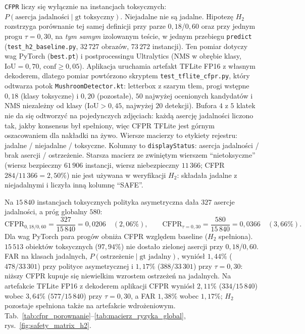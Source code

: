 \texttt{CFPR} liczy się wyłącznie na instancjach toksycznych: $P(\text{asercja jadalności}\mid\text{gt toksyczny})$. Niejadalne nie są jadalne. Hipotezę $H_2$ rozstrzyga porównanie tej samej definicji przy parze $0{,}18$/$0{,}60$ oraz przy jednym progu $\tau=0{,}30$, na \emph{tym samym} izolowanym teście, w jednym przebiegu \texttt{predict} (\texttt{test\_h2\_baseline.py}, $32\,727$ obrazów, $73\,272$ instancji). Ten pomiar dotyczy wag PyTorch (\texttt{best.pt}) i postprocessingu Ultralytics (NMS w obrębie klasy, $\mathrm{IoU}=0{,}70$, $\mathrm{conf}\ge0{,}05$). Aplikacja uruchamia artefakt TFLite FP16 z własnym dekoderem, dlatego pomiar powtórzono skryptem \texttt{test\_tflite\_cfpr.py}, który odtwarza potok \texttt{MushroomDetector.kt}: letterbox z szarym tłem, progi wstępne $0{,}18$ (klasy toksyczne) i $0{,}20$ (pozostałe), $50$ najwyżej ocenionych kandydatów i NMS niezależny od klasy ($\mathrm{IoU}>0{,}45$, najwyżej $20$ detekcji). Bufora $4$ z $5$ klatek nie da się odtworzyć na pojedynczych zdjęciach: każdą asercję jadalności liczono tak, jakby konsensus był spełniony, więc CFPR TFLite jest górnym oszacowaniem dla nakładki na żywo. Wiersze macierzy to etykiety rejestru: jadalne / niejadalne / toksyczne. Kolumny to \texttt{displayStatus}: asercja jadalności / brak asercji / ostrzeżenie. Starsza macierz ze zwiniętym wierszem ``nietoksyczne'' (wiersz bezpieczny $61\,906$ instancji, wiersz niebezpieczny $11\,366$; CFPR $284/11\,366=2{,}50\%$) nie jest używana w weryfikacji $H_2$: składała jadalne z niejadalnymi i liczyła inną kolumnę ``SAFE''.

Na $15\,840$ instancjach toksycznych polityka asymetryczna dała $327$ asercje jadalności, a próg globalny $580$:
\begin{equation}
\mathrm{CFPR}_{0{,}18/0{,}60}
=
\frac{327}{15\,840}
=
0{,}0206
\quad (2{,}06\%),\qquad
\mathrm{CFPR}_{\tau=0{,}30}
=
\frac{580}{15\,840}
=
0{,}0366
\quad (3{,}66\%).
\end{equation}
Dla wag PyTorch para progów obniża CFPR względem baseline ($H_2$ spełniona). $15\,513$ obiektów toksycznych ($97{,}94\%$) nie dostało zielonej asercji przy $0{,}18$/$0{,}60$. FAR na klasach jadalnych, $P(\text{ostrzeżenie}\mid\text{gt jadalny})$, wyniósł $1{,}44\%$ ($478/33\,301$) przy polityce asymetrycznej i $1{,}17\%$ ($388/33\,301$) przy $\tau=0{,}30$: niższy CFPR kupuje się niewielkim wzrostem ostrzeżeń na jadalnych. Na artefakcie TFLite FP16 z dekoderem aplikacji CFPR wyniósł $2{,}11\%$ ($334/15\,840$) wobec $3{,}64\%$ ($577/15\,840$) przy $\tau=0{,}30$, a FAR $1{,}38\%$ wobec $1{,}17\%$; $H_2$ pozostaje spełniona także na artefakcie wdrożeniowym. Tab.~\ref{tab:cfpr_porownanie}--\ref{tab:macierz_ryzyka_global}, rys.~\ref{fig:safety_matrix_h2}.

